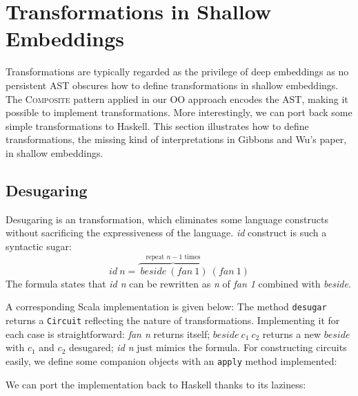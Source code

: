 \section{Transformations in Shallow Embeddings}
Transformations are typically regarded as the privilege of deep embeddings as no
persistent AST obscures how to define transformations in shallow embeddings.
The \textsc{Composite} pattern applied in our OO approach encodes the AST, making
it possible to implement transformations. More interestingly, we can port back
some simple transformations to Haskell.
This section illustrates how to define transformations, the missing kind of interpretations in Gibbons and Wu's paper, in shallow embeddings.

\subsection{Desugaring}
Desugaring is an transformation, which eliminates some
language constructs without sacrificing the expressiveness of the language.
\emph{id} construct is such a syntactic sugar:
$$id\ n = \overbrace{\ beside\ (fan\ 1)}^{\text{repeat }n-1\text{ times}}\ (fan\ 1)$$
The formula states that \emph{id n} can be rewritten as \emph{n} of \emph{fan 1}
combined with \emph{beside}.

A corresponding Scala implementation is given below:
The method \lstinline{desugar} returns a
\lstinline{Circuit} reflecting the nature of transformations.
Implementing it for each case is
straightforward: \emph{fan n} returns itself; $beside\ c_1\ c_2$ returns a new
$beside$ with $c_1$ and $c_2$ desugared; \emph{id n} just mimics the formula.
For constructing circuits easily, we define some companion objects with an \lstinline{apply} method implemented:

We can port the implementation back to Haskell thanks to its laziness:


